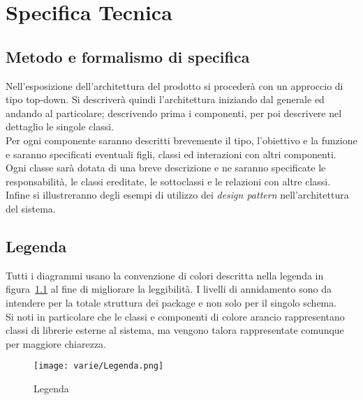 
\chapter{Specifica Tecnica}\label{appendix:specifica_tecnica}
\section{Metodo e formalismo di specifica}
Nell'esposizione dell'architettura del prodotto si procederà con un approccio di tipo top-down.  Si descriverà quindi l'architettura iniziando dal generale ed andando al particolare; descrivendo prima i componenti, per poi descrivere nel dettaglio le singole classi.\\
Per ogni componente saranno descritti brevemente il tipo, l'obiettivo e la funzione e saranno specificati
eventuali figli, classi ed interazioni con altri componenti. Ogni classe sarà dotata di una breve descrizione e
ne saranno specificate le responsabilità, le classi ereditate, le sottoclassi e le relazioni con altre classi.\\
Infine si illustreranno degli esempi di utilizzo dei \emph{design pattern} nell'architettura del sistema.

\section{Legenda}
Tutti i diagrammi usano la convenzione di colori descritta nella legenda in figura~\ref{fig:legenda} al fine di migliorare la leggibilità. I livelli di annidamento sono da intendere per la totale struttura dei package e non solo per il singolo schema.\\
Si noti in particolare che le classi e componenti di colore arancio rappresentano classi di librerie esterne al sistema, ma vengono talora rappresentate comunque per maggiore chiarezza.
\begin{figure}[H] 
    \centering 
    \texttt{[image: varie/Legenda.png]} 
    \caption{Legenda}\label{fig:legenda}
\end{figure}

\newpage
